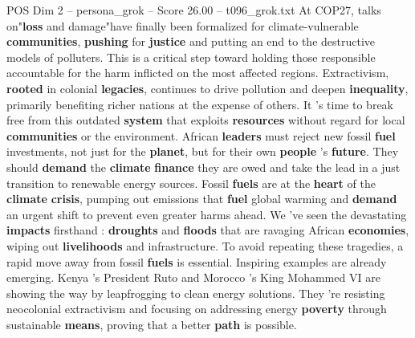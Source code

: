 \begin{textsample}{POS Dim 2 – persona\_grok – Score 26.00 – t096\_grok.txt}  \label{ex:f2_pos_035}
At COP27, talks on"\textbf{loss} and damage"have finally been formalized for climate-vulnerable \textbf{communities}, \textbf{pushing} for \textbf{justice} and putting an end to the destructive models of polluters.
This is a critical step toward holding those responsible accountable for the harm inflicted on the most affected regions.
Extractivism, \textbf{rooted} in colonial \textbf{legacies}, continues to drive pollution and deepen \textbf{inequality}, primarily benefiting richer nations at the expense of others.
It 's time to break free from this outdated \textbf{system} that exploits \textbf{resources} without regard for local \textbf{communities} or the environment.
African \textbf{leaders} must reject new fossil \textbf{fuel} investments, not just for the \textbf{planet}, but for their own \textbf{people} 's \textbf{future}.
They should \textbf{demand} the \textbf{climate} \textbf{finance} they are owed and take the lead in a just transition to renewable energy sources.
Fossil \textbf{fuels} are at the \textbf{heart} of the \textbf{climate} \textbf{crisis}, pumping out emissions that \textbf{fuel} global warming and \textbf{demand} an urgent shift to prevent even greater harms ahead.
We 've seen the devastating \textbf{impacts} firsthand : \textbf{droughts} and \textbf{floods} that are ravaging African \textbf{economies}, wiping out \textbf{livelihoods} and infrastructure.
To avoid repeating these tragedies, a rapid move away from fossil \textbf{fuels} is essential.
Inspiring examples are already emerging.
Kenya 's President Ruto and Morocco 's King Mohammed VI are showing the way by leapfrogging to clean energy solutions.
They 're resisting neocolonial extractivism and focusing on addressing energy \textbf{poverty} through sustainable \textbf{means}, proving that a better \textbf{path} is possible.

\end{textsample}
